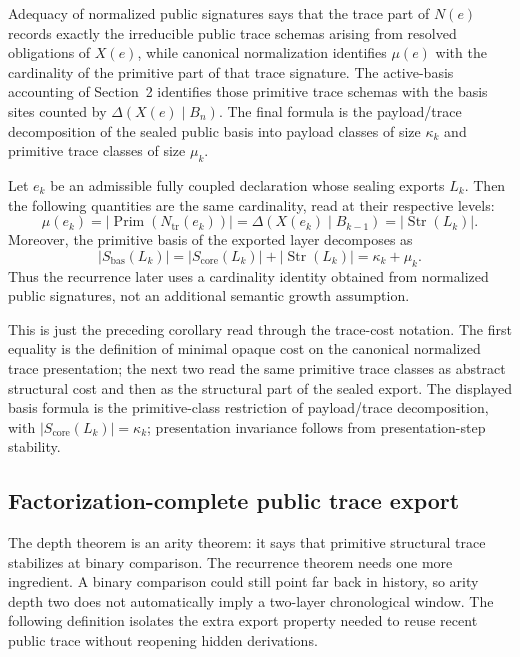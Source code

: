 \documentclass{lmcs}
\begin{document}
Adequacy of normalized public signatures says that the trace part of \(N(e)\) records exactly
the irreducible public trace schemas arising from resolved obligations of \(X(e)\), while
canonical normalization identifies \(\mu(e)\) with the cardinality of the primitive part of that
trace signature.  The active-basis accounting of Section~2 identifies those primitive trace
schemas with the basis sites counted by \(\Delta(X(e)\mid B_n)\).  The final formula is the
payload/trace decomposition of the sealed public basis into payload classes of size
\(\kappa_k\) and primitive trace classes of size \(\mu_k\).

\begin{lem}
Let \(e_k\) be an admissible fully coupled declaration whose sealing exports \(L_k\).  Then
the following quantities are the same cardinality, read at their respective levels:
\[
  \mu(e_k)
  = \left|\operatorname{Prim}(N_{\mathrm{tr}}(e_k))\right|
  = \Delta(X(e_k)\mid B_{k-1})
  = |\operatorname{Str}(L_k)|.
\]
Moreover, the primitive basis of the exported layer decomposes as
\[
  |S_{\mathrm{bas}}(L_k)|
  = |S_{\mathrm{core}}(L_k)| + |\operatorname{Str}(L_k)|
  = \kappa_k + \mu_k.
\]
Thus the recurrence later uses a cardinality identity obtained from normalized public
signatures, not an additional semantic growth assumption.
\end{lem}
This is just the preceding corollary read through the trace-cost notation.  The first equality
is the definition of minimal opaque cost on the canonical normalized trace presentation; the
next two read the same primitive trace classes as abstract structural cost and then as the
structural part of the sealed export.  The displayed basis formula is the primitive-class
restriction of payload/trace decomposition, with
\(|S_{\mathrm{core}}(L_k)|=\kappa_k\); presentation invariance follows from
presentation-step stability.

\subsection{Factorization-complete public trace export}

The depth theorem is an arity theorem: it says that primitive structural trace stabilizes at
binary comparison.  The recurrence theorem needs one more ingredient.  A binary comparison
could still point far back in history, so arity depth two does not automatically imply a
two-layer chronological window.  The following definition isolates the extra export property
needed to reuse recent public trace without reopening hidden derivations.
\end{document}
